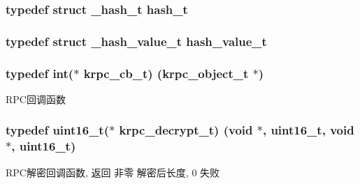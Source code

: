 \subsubsection[{hash\+\_\+t}]{\setlength{\rightskip}{0pt plus 5cm}typedef struct {\bf \+\_\+hash\+\_\+t} {\bf hash\+\_\+t}}\label{a00044_a188677c3015513590ab998e96b999966_a188677c3015513590ab998e96b999966}
\hypertarget{a00044_af7ecd66aeef0ce1b0495e5f65e77733e_af7ecd66aeef0ce1b0495e5f65e77733e}{}
\subsubsection[{hash\+\_\+value\+\_\+t}]{\setlength{\rightskip}{0pt plus 5cm}typedef struct {\bf \+\_\+hash\+\_\+value\+\_\+t} {\bf hash\+\_\+value\+\_\+t}}\label{a00044_af7ecd66aeef0ce1b0495e5f65e77733e_af7ecd66aeef0ce1b0495e5f65e77733e}
\hypertarget{a00044_a06bb708c1b97445d3a5d0c1b32ad2ab6_a06bb708c1b97445d3a5d0c1b32ad2ab6}{}
\subsubsection[{krpc\+\_\+cb\+\_\+t}]{\setlength{\rightskip}{0pt plus 5cm}typedef int($\ast$ krpc\+\_\+cb\+\_\+t) ({\bf krpc\+\_\+object\+\_\+t} $\ast$)}\label{a00044_a06bb708c1b97445d3a5d0c1b32ad2ab6_a06bb708c1b97445d3a5d0c1b32ad2ab6}
R\+P\+C回调函数 \hypertarget{a00044_a5cf750f151c90f0589f68fe8c4421f1d_a5cf750f151c90f0589f68fe8c4421f1d}{}
\subsubsection[{krpc\+\_\+decrypt\+\_\+t}]{\setlength{\rightskip}{0pt plus 5cm}typedef uint16\+\_\+t($\ast$ krpc\+\_\+decrypt\+\_\+t) (void $\ast$, uint16\+\_\+t, void $\ast$, uint16\+\_\+t)}\label{a00044_a5cf750f151c90f0589f68fe8c4421f1d_a5cf750f151c90f0589f68fe8c4421f1d}
R\+P\+C解密回调函数, 返回 非零 解密后长度, 0 失败 \hypertarget{a00044_ae41a67cc07f8dff897ca978e03b1f2d7_ae41a67cc07f8dff897ca978e03b1f2d7}{}
